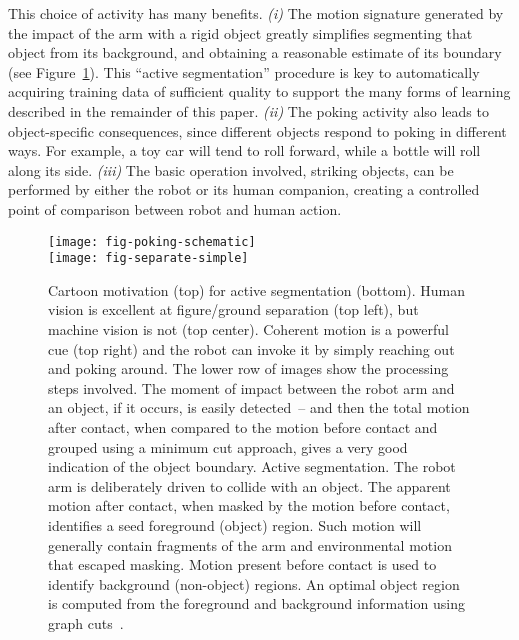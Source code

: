 This choice of activity has many benefits.  
%
{\em (i)}
The motion signature
generated by the impact of the arm with a rigid object greatly
simplifies segmenting that object from its background, and obtaining a
reasonable estimate of its boundary (see
Figure~\ref{fig:separate-simple}).  
This ``active segmentation''
procedure is key to automatically acquiring training data of
sufficient quality to support the many forms of learning described in
the remainder of this paper.
%
{\em (ii)}
The poking activity also leads to object-specific consequences, since
different objects respond to poking in different ways.  For example,
a toy car will tend to roll forward, while a bottle will roll along its
side.
%
{\em (iii)} The basic operation involved, striking objects, can be
performed by either the robot or its human companion, creating a
controlled point of comparison between robot and human action.


%



\begin{figure}[bt]
\texttt{[image: fig-poking-schematic]}\\
\texttt{[image: fig-separate-simple]}
\caption
{
\label{fig:separate-simple}
%
Cartoon motivation (top) for active segmentation (bottom).
Human vision is excellent at figure/ground separation (top left),
but machine vision is not (top center).  Coherent motion is a 
powerful cue (top right) and the robot can invoke it by 
simply reaching out and poking around.  
The lower row of images
show the processing steps involved.  The moment of impact between
the robot arm and an object, if it occurs, is
easily detected~-- and then
the total motion after contact, when compared to the motion before
contact and grouped using a minimum cut approach, gives a very
good indication of the object boundary. %
Active segmentation.  The robot arm is deliberately driven
to collide with an object.
 The
apparent motion after contact, when masked by the motion before
contact, identifies a seed foreground (object) region.  Such motion
will generally contain fragments of the arm and environmental motion
that escaped masking.  Motion present before contact is used to
identify background (non-object) regions.  
An optimal object region is computed from the foreground and
background information using graph cuts~\citep{boykov01experimental}.
%
%
}
\end{figure}

